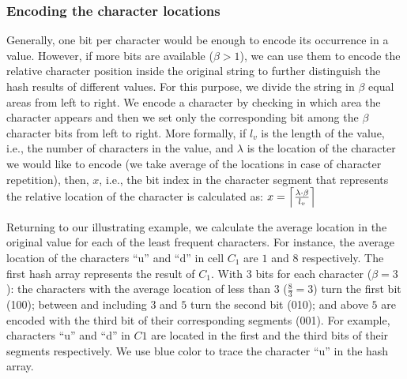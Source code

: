 \subsubsection{Encoding the character locations}
Generally, one bit per character would be enough to encode its occurrence in a value.%
However, if more bits are available ($\beta>1$), we can use them to encode the relative character position inside the original string to further distinguish the hash results of different values. For this purpose, we divide the string in $\beta$ equal areas from left to right. 
We encode a character by checking in which area the character appears and then we set only the corresponding bit among the $\beta$ character bits from left to right.
More formally, if $l_v$ is the length of the value, i.e., the number of characters in the value, and $\lambda$ is the location of the character we would like to encode (we take average of the locations in case of character repetition), then, $x$, i.e., the bit index in the character segment that represents the relative location of the character is calculated as: $x = \ceil*{\frac{\lambda\cdot \beta}{l_{v}}}$


Returning to our illustrating example, we calculate the average location in the original value for each of the least frequent characters.
For instance, the average location of the characters ``u'' and ``d'' in cell $C_1$ are $1$ and $8$ respectively.
The first hash array represents the \hash result of $C_1$.
With 3 bits for each character ($\beta = 3$):
the characters with the average location of less than $3$ ($\frac{8}{3}=3$) turn the first bit (100);
between and including $3$ and $5$ turn the second bit (010); and
above $5$ are encoded with the third bit of their corresponding segments (001).
For example, characters ``u'' and ``d'' in $C1$ are located in the first and the third bits of their segments respectively.
We use blue color to trace the character ``u'' in the hash array.

